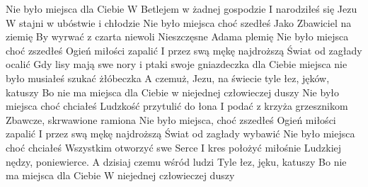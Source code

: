 \beginverse
Nie było miejsca dla Ciebie
W Betlejem w żadnej gospodzie
I narodziłeś się Jezu
W stajni w ubóstwie i chłodzie
Nie było miejsca choć szedłeś
Jako Zbawiciel na ziemię
By wyrwać z czarta niewoli
Nieszczęsne Adama plemię
\endverse
\beginchorus
Nie było miejsca choć zszedłeś
Ogień miłości zapalić
I przez swą mękę najdroższą
Świat od zagłady ocalić
\endchorus
\beginverse
Gdy lisy mają swe nory
i ptaki swoje gniazdeczka
dla Ciebie miejsca nie było
musiałeś szukać żłóbeczka
A czemuż, Jezu, na świecie
tyle łez, jęków, katuszy
Bo nie ma miejsca dla Ciebie
w niejednej człowieczej duszy
\endverse
\beginverse
Nie było miejsca choć chciałeś
Ludzkość przytulić do łona
I podać z krzyża grzesznikom
Zbawcze, skrwawione ramiona
Nie było miejsca, choć zszedłeś
Ogień miłości zapalić
I przez swą mękę najdroższą
Świat od zagłady wybawić
\endverse
\beginverse
Nie było miejsca choć chciałeś
Wszystkim otworzyć swe Serce
I kres położyć miłośnie
Ludzkiej nędzy, poniewierce.
A dzisiaj czemu wśród ludzi
Tyle łez, jęku, katuszy
Bo nie ma miejsca dla Ciebie
W niejednej człowieczej duszy
\endverse
\endsong
